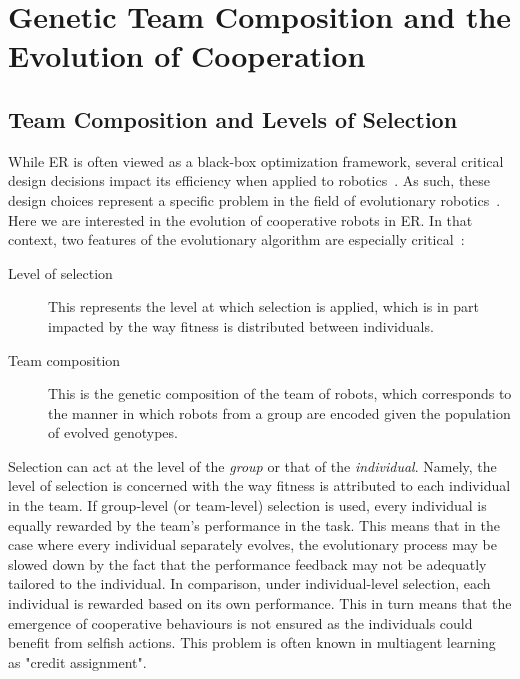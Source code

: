 

\section{Genetic Team Composition and the Evolution of Cooperation}

  \subsection{Team Composition and Levels of Selection}

    While ER is often viewed as a black-box optimization framework, several critical design decisions impact its efficiency when applied to robotics~\parencite{Trianni2014b}. As such, these design choices represent a specific problem in the field of evolutionary robotics~\parencite{Doncieux2014a}. Here we are interested in the evolution of cooperative robots in ER. In that context, two features of the evolutionary algorithm are especially critical~\parencite{Waibel2009, Lichocki2013}:

    \begin{description}
      \item[Level of selection] {This represents the level at which selection is applied, which is in part impacted by the way fitness is distributed between individuals.}

      \item[Team composition] {This is the genetic composition of the team of robots, which corresponds to the manner in which robots from a group are encoded given the population of evolved genotypes.}
    \end{description}

    Selection can act at the level of the \emph{group} or that of the \emph{individual}. Namely, the level of selection is concerned with the way fitness is attributed to each individual in the team. If group-level (or team-level) selection is used, every individual is equally rewarded by the team's performance in the task. This means that in the case where every individual separately evolves, the evolutionary process may be slowed down by the fact that the performance feedback may not be adequatly tailored to the individual. In comparison, under individual-level selection, each individual is rewarded based on its own performance. This in turn means that the emergence of cooperative behaviours is not ensured as the individuals could benefit from selfish actions. This problem is often known in multiagent learning as "credit assignment".

